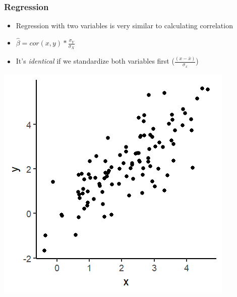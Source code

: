 \documentclass[xcolor=x11names,compress]{beamer}\usepackage[]{graphicx}\usepackage[]{color}
\makeatletter
\def\maxwidth{ %
  \ifdim\Gin@nat@width>\linewidth
    \linewidth
  \else
    \Gin@nat@width
  \fi
}
\newenvironment{knitrout}{}{} %
\renewcommand{\(}{\begin{columns}}
\renewcommand{\)}{\end{columns}}
\newcommand{\<}[1]{\begin{column}{#1}}
\renewcommand{\>}{\end{column}}
\makeatother
\begin{document}
\begin{frame}
\frametitle{Regression}
\begin{itemize}
\item Regression with two variables is very similar to calculating correlation
\pause
\item $\hat{\beta}=cor(x,y) * \frac{\sigma_Y}{\sigma_X}$
\pause
\item It's \textit{identical} if we standardize both variables first ($\frac{(x-\bar{x})}{\sigma_x}$)
\pause
\end{itemize}
\begin{multicols}{2}
\begin{knitrout}
\color{fgcolor}
\includegraphics[width=\maxwidth]{figure/corr_regn_fig1-1} 

\end{knitrout}
\columnbreak
\end{multicols}
\end{frame}
\end{document}
